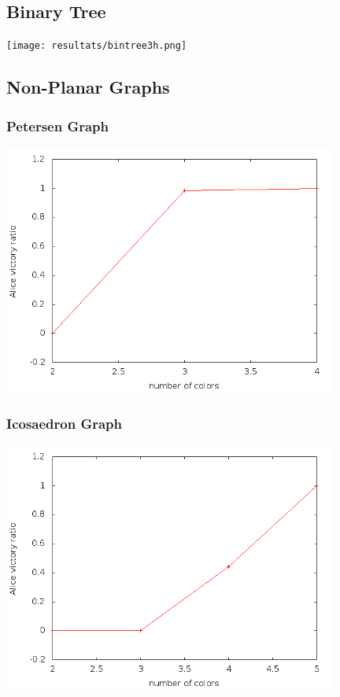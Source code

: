 \subsection{Binary Tree}

\texttt{[image: resultats/bintree3h.png]}

\subsection{Non-Planar Graphs}

\subsubsection{Petersen Graph}

\includegraphics[width=11cm]{resultats/petersen.png}

\subsubsection{Icosaedron Graph}

\includegraphics[width=11cm]{resultats/icosaedre.png}